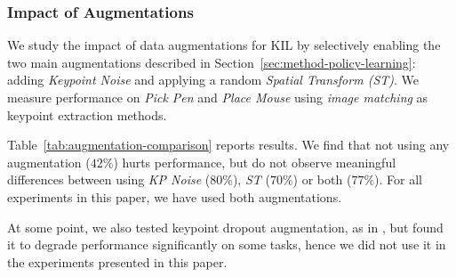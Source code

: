 \documentclass[letterpaper, 10 pt, conference]{ieeeconf}  %
\begin{document}
\subsubsection{Impact of Augmentations}
\label{sec:appendix-additional-experiments-augmentations}
We study the impact of data augmentations for KIL by selectively enabling the two main augmentations described in Section~\ref{sec:method-policy-learning}: adding \textit{Keypoint Noise} and applying a random \textit{Spatial Transform (ST)}. We measure performance on \textit{Pick Pen} and \textit{Place Mouse} using \textit{image matching} as keypoint extraction methods. 


Table~\ref{tab:augmentation-comparison} reports results. We find that not using any augmentation ($42\%$) hurts performance, but do not observe meaningful differences between using \textit{KP Noise} ($80\%$), \textit{ST} ($70\%$) or both ($77\%$). For all experiments in this paper, we have used both augmentations. 

At some point, we also tested keypoint dropout augmentation, as in \cite{wang2025skil}, but found it to degrade performance significantly on some tasks, hence we did not use it in the experiments presented in this paper.
\end{document}
